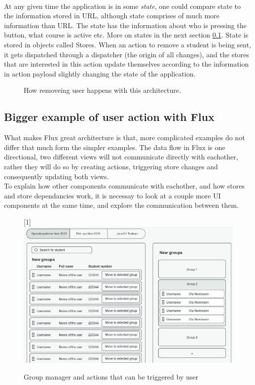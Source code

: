\\At any given time the application is in some \emph{state}, one could compare state to the information stored in URL, although state comprises of much more information than URL. The state has the information about who is pressing the button, what course is active etc. More on states in the next section \ref{sec:advancedfluxexample}. State is stored in objects called Stores. When an action to remove a student is being sent, it gets dispatched through a dispatcher (the origin of all changes), and the stores that are interested in this action update themselves according to the information in action payload slightly changing the state of the application.

\begin{figure}[h]
  \scalebox{0.8}{}
  \caption{How removeing user happens with this architecture.}
  \label{fig:simplefluxremoveuser}
\end{figure}

\subsection{Bigger example of user action with Flux}\label{sec:advancedfluxexample}
What makes Flux great architecture is that, more complicated examples do not differ that much form the simpler examples. The data flow in Flux is one directional, two different views will not communicate directly with eachother, rather they will do so by creating actions, triggering store changes and consequently updating both views.
\\To explain how other components communicate with eachother, and how stores and store dependancies work, it is necessay to look at a couple more UI components at the same time, and explore the communication between them. 

\begin{figure}[h]
  \scalebox{1}[1]{{\includegraphics[width=1\linewidth]{graphics/advancedlaboverview.png}}}
  \caption{Group manager and actions that can be triggered by user}
  \label{fig:advancedgroupmanager}
\end{figure}

